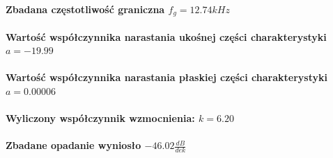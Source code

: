 \documentclass[a4paper,12pt]{article}
\begin{document}
\begin{justify}
\paragraph{Zbadana częstotliwość graniczna $f_{g} = 12.74kHz$}

\paragraph{Wartość współczynnika narastania ukośnej części charakterystyki $a = -19.99$}
\paragraph{Wartość współczynnika narastania płaskiej części charakterystyki $a = 0.00006$}

\paragraph{Wyliczony współczynnik wzmocnienia: $k = 6.20$}

\paragraph{Zbadane opadanie wyniosło $-46.02 \frac{dB}{dek}$}

\paragraph{\,}

\end{justify}
\end{document}
